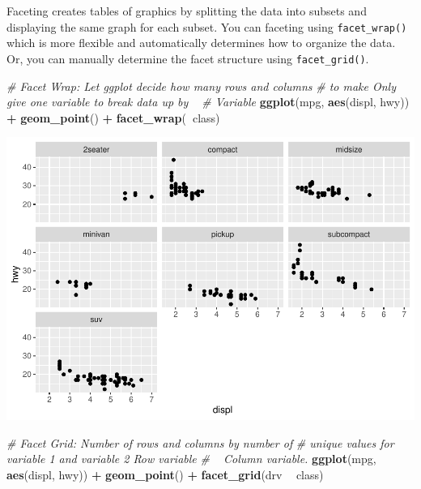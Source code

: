 \documentclass[
]{book}
\newenvironment{Shaded}{\begin{snugshade}}{\end{snugshade}}
\newcommand{\CommentTok}[1]{\textcolor[rgb]{0.56,0.35,0.01}{\textit{#1}}}
\newcommand{\KeywordTok}[1]{\textcolor[rgb]{0.13,0.29,0.53}{\textbf{#1}}}
\newcommand{\NormalTok}[1]{#1}
\newcommand{\OperatorTok}[1]{\textcolor[rgb]{0.81,0.36,0.00}{\textbf{#1}}}
\newcommand{\StringTok}[1]{\textcolor[rgb]{0.31,0.60,0.02}{#1}}
\begin{document}
Faceting creates tables of graphics by splitting the data into subsets and displaying the same graph for each subset. You can faceting using \texttt{facet\_wrap()} which is more flexible and automatically determines how to organize the data. Or, you can manually determine the facet structure using \texttt{facet\_grid()}.

\begin{Shaded}
\begin{Highlighting}[]
\CommentTok{# Facet Wrap: Let ggplot decide how many rows and columns}
\CommentTok{# to make Only give one variable to break data up by ~}
\CommentTok{# Variable}
\KeywordTok{ggplot}\NormalTok{(mpg, }\KeywordTok{aes}\NormalTok{(displ, hwy)) }\OperatorTok{+}\StringTok{ }\KeywordTok{geom_point}\NormalTok{() }\OperatorTok{+}\StringTok{ }\KeywordTok{facet_wrap}\NormalTok{(}\OperatorTok{~}\NormalTok{class)}
\end{Highlighting}
\end{Shaded}

\includegraphics{_main_files/figure-latex/unnamed-chunk-318-1.pdf}

\begin{Shaded}
\begin{Highlighting}[]
\CommentTok{# Facet Grid: Number of rows and columns by number of}
\CommentTok{# unique values for variable 1 and variable 2 Row variable}
\CommentTok{# ~ Column variable.}
\KeywordTok{ggplot}\NormalTok{(mpg, }\KeywordTok{aes}\NormalTok{(displ, hwy)) }\OperatorTok{+}\StringTok{ }\KeywordTok{geom_point}\NormalTok{() }\OperatorTok{+}\StringTok{ }\KeywordTok{facet_grid}\NormalTok{(drv }\OperatorTok{~}
\StringTok{    }\NormalTok{class)}
\end{Highlighting}
\end{Shaded}
\end{document}
